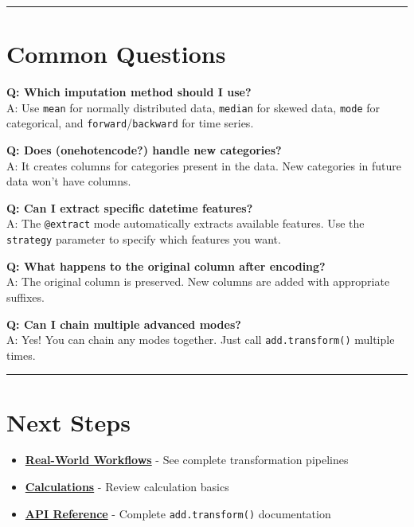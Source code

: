 \documentclass[
  letterpaper,
]{scrbook}
\providecommand{\tightlist}{%
  \setlength{\itemsep}{0pt}\setlength{\parskip}{0pt}}
\begin{document}
\begin{center}\rule{0.5\linewidth}{0.5pt}\end{center}

\section{Common Questions}\label{common-questions-8}

\textbf{Q: Which imputation method should I use?}\\
A: Use \texttt{mean} for normally distributed data, \texttt{median} for
skewed data, \texttt{mode} for categorical, and
\texttt{forward}/\texttt{backward} for time series.

\textbf{Q: Does (\textbf{onehotencode?}) handle new categories?}\\
A: It creates columns for categories present in the data. New categories
in future data won't have columns.

\textbf{Q: Can I extract specific datetime features?}\\
A: The \texttt{@extract} mode automatically extracts available features.
Use the \texttt{strategy} parameter to specify which features you want.

\textbf{Q: What happens to the original column after encoding?}\\
A: The original column is preserved. New columns are added with
appropriate suffixes.

\textbf{Q: Can I chain multiple advanced modes?}\\
A: Yes! You can chain any modes together. Just call
\texttt{add.transform()} multiple times.

\begin{center}\rule{0.5\linewidth}{0.5pt}\end{center}

\section{Next Steps}\label{next-steps-10}

\begin{itemize}
\tightlist
\item
  \textbf{\href{examples-transform-05-real-world.html}{Real-World
  Workflows}} - See complete transformation pipelines
\item
  \textbf{\href{examples-transform-01-calc.html}{Calculations}} - Review
  calculation basics
\item
  \textbf{\href{reference-transform.html}{API Reference}} - Complete
  \texttt{add.transform()} documentation
\end{itemize}
\end{document}
